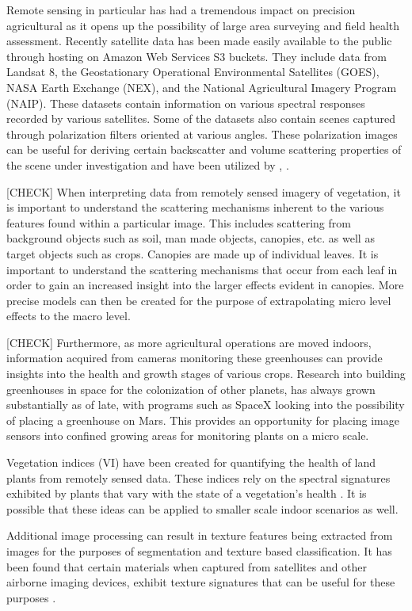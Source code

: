 Remote sensing in particular has had a tremendous impact on precision agricultural as it opens up the possibility of large area surveying and field health assessment.  Recently satellite data has been made easily available to the public through hosting on Amazon Web Services S3 buckets.  They include data from Landsat 8, the Geostationary Operational Environmental Satellites (GOES), NASA Earth Exchange (NEX), and the National Agricultural Imagery Program (NAIP).  These datasets contain information on various spectral responses recorded by various satellites.  Some of the datasets also contain scenes captured through polarization filters oriented at various angles. These polarization images can be useful for deriving certain backscatter and volume scattering properties of the scene under investigation and have been utilized by \cite{mississippi}, \cite{sarag}.

[CHECK] When interpreting data from remotely sensed imagery of vegetation, it is important to understand the scattering mechanisms inherent to the various features found within a particular image.  This includes scattering from background objects such as soil, man made objects, canopies, etc. as well as target objects such as crops. Canopies are made up of individual leaves.  It is important to understand the scattering mechanisms that occur from each leaf in order to gain an increased insight into the larger effects evident in canopies. More precise models can then be created for the purpose of extrapolating micro level effects to the macro level.

[CHECK] Furthermore, as more agricultural operations are moved indoors, information acquired from cameras monitoring these greenhouses can provide insights into the health and growth stages of various crops. Research into building greenhouses in space for the colonization of other planets, has always grown substantially as of late, with programs such as SpaceX looking into the possibility of placing a greenhouse on Mars.  This provides an opportunity for placing image sensors into confined growing areas for monitoring plants on a micro scale.

Vegetation indices (VI) have been created for quantifying the health of land plants from remotely sensed data.  These indices rely on the spectral signatures exhibited by plants that vary with the state of a vegetation’s health \cite{remotesensing}.  It is possible that these ideas can be applied to smaller scale indoor scenarios as well.

Additional image processing can result in texture features being extracted from images for the purposes of segmentation and texture based classification.  It has been found that certain materials when captured from satellites and other airborne imaging devices, exhibit texture signatures that can be useful for these purposes \cite{seaice}.

